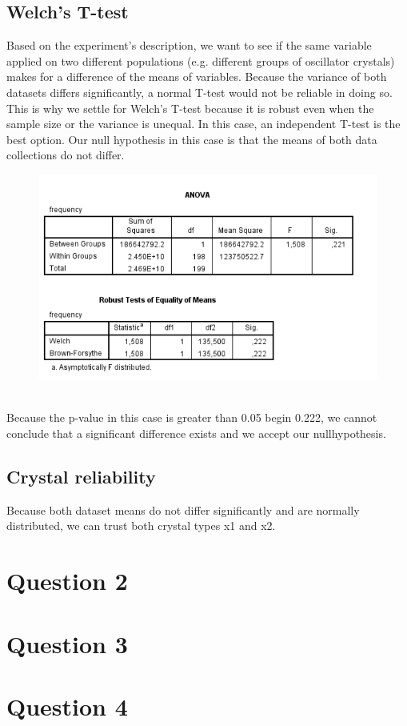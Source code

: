 \documentclass[14]{article}
\begin{document}
\subsection{Welch's T-test}
Based on the experiment's description, we want to see if the same variable applied on two different populations (e.g. different groups of oscillator crystals) makes for a difference of the means of variables. Because the variance of both datasets differs significantly, a normal T-test would not be reliable in doing so. 
\newline
This is why we settle for Welch's T-test because it is robust even when the sample size or the variance is unequal. In this case, an independent T-test is the best option. Our null hypothesis in this case is that the means of both data collections do not differ. 

\begin{figure}[!htb]
	\includegraphics[width=1.0\textwidth]{img/question1/question1_b.PNG}
	\captionsetup{width=1.0\textwidth}
	\centering
\end{figure}
\mbox{}\\ 
Because the p-value in this case is greater than 0.05 begin 0.222, we cannot conclude that a significant difference exists and we accept our nullhypothesis.

\subsection{Crystal reliability}
Because both dataset means do not differ significantly and are normally distributed, we can trust both crystal types x1 and x2. 

\section{Question 2}
\section{Question 3}
\section{Question 4}
\end{document}
